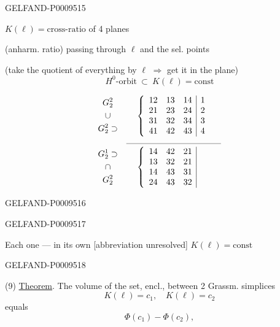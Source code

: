 \begin{GelfandAdjacentEvidence}{GELFAND-P000951}{5}


$K(\ell)=\text{cross-ratio}$ of 4 planes\par
\hspace{2em}(anharm. ratio) \quad passing through $\ell$ and the sel. points

(take the quotient of everything by $\ell$ $\Rightarrow$ get it in the plane)
\[
 H^0\text{-orbit}\ \subset\ K(\ell)=\mathrm{const}
\]

\[
 \begin{array}{cc}
  \begin{gathered}
   G_2^2\\
   \cup\\
   G_2^2\supset
  \end{gathered}
  &
  \left\{\begin{array}{ccc|c}
   12&13&14&1\\
   21&23&24&2\\
   31&32&34&3\\
   41&42&43&4
  \end{array}\right.\\
  &\rule{11em}{0.3pt}\\
  \begin{gathered}
   G_2^1\supset\\
   \cap\\
   G_2^2
  \end{gathered}
  &
  \left\{\begin{array}{ccc|c}
   14&42&21&\phantom{1}\\
   13&32&21&\\
   14&43&31&\\
   24&43&32&
  \end{array}\right.
 \end{array}
\]
\end{GelfandAdjacentEvidence}
\begin{GelfandAdjacentEvidence}{GELFAND-P000951}{6}

\end{GelfandAdjacentEvidence}
\begin{GelfandAdjacentEvidence}{GELFAND-P000951}{7}


Each one --- in its own [abbreviation unresolved] $K(\ell)=\mathrm{const}$
\end{GelfandAdjacentEvidence}
\begin{GelfandAdjacentEvidence}{GELFAND-P000951}{8}


(9) \underline{Theorem}. The volume of the set, encl., between 2 Grassm. simplices
\[
 K(\ell)=c_1,\quad K(\ell)=c_2
\]
equals
\[
 \Phi(c_1)-\Phi(c_2),
\]
\end{GelfandAdjacentEvidence}


